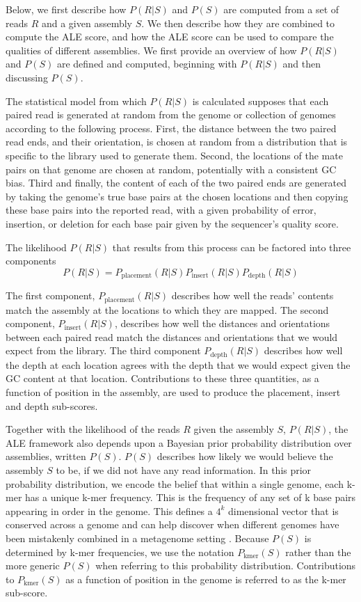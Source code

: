 \documentclass[phd,tocprelim]{cornell}
\begin{document}
Below, we first describe how $P(R|S)$ and $P(S)$ are computed from a set of reads $R$ and a given assembly $S$.  We then describe how they are combined to compute the ALE score, and how the ALE score can be used to compare the qualities of different assemblies. We first provide an overview of how $P(R|S)$ and $P(S)$ are defined and computed, beginning with $P(R|S)$ and then discussing $P(S)$.

The statistical model from which $P(R|S)$ is calculated supposes that each paired read is generated at random from the genome or collection of genomes according to the following process.  First, the distance between the two paired read ends, and their orientation, is chosen at random from a distribution that is specific to the library used to generate them.  Second, the locations of the mate pairs on that genome are chosen at random, potentially with a consistent GC bias.  Third and finally, the content of each of the two paired ends are generated by taking the genome's true base pairs at the chosen locations and then copying these base pairs into the reported read, with a given probability of error, insertion, or deletion for each base pair given by the sequencer's quality score.

The likelihood $P(R|S)$ that results from this process can be factored into three components
\begin{equation}
    P(R|S)=P_{\text{placement}}(R|S)P_{\text{insert}}(R|S)P_{\text{depth}}(R|S)
\end{equation}

The first component, $P_{\text{placement}}(R|S)$ describes how well the reads' contents match the assembly at the locations to which they are mapped. The second component, $P_{\text{insert}}(R|S)$, describes how well the distances and orientations between each paired read match the distances and orientations that we would expect from the library.  The third component $P_{\text{depth}}(R|S)$ describes how well the depth at each location agrees with the depth that we would expect given the GC content at that location. Contributions to these three quantities, as a function of position in the assembly, are used to produce the placement, insert and depth sub-scores.

Together with the likelihood of the reads $R$ given the assembly $S$, $P(R|S)$, the ALE framework also depends upon a Bayesian prior probability distribution over assemblies, written $P(S)$.  $P(S)$ describes how likely we would believe the assembly $S$ to be, if we did not have any read information.  In this prior probability distribution, we encode the belief that within a single genome, each k-mer has a unique k-mer frequency. This is the frequency of any set of k base pairs appearing in order in the genome. This defines a $4^{k}$ dimensional vector that is conserved across a genome and can help discover when different genomes have been mistakenly combined in a metagenome setting \cite{Teeling2004} \cite{Woyke2006}. Because $P(S)$ is determined by k-mer frequencies, we use the notation $P_{\text{kmer}}(S)$ rather than the more generic $P(S)$ when referring to this probability distribution. Contributions to $P_{\text{kmer}}(S)$ as a function of position in the genome is referred to as the k-mer sub-score.
\end{document}
